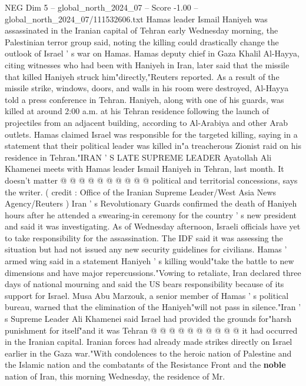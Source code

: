 \begin{textsample}{NEG Dim 5 – global\_north\_2024\_07 – Score -1.00 – global\_north\_2024\_07/111532606.txt}  \label{ex:f5_neg_159}
Hamas leader Ismail Haniyeh was assassinated in the Iranian capital of Tehran early Wednesday morning, the Palestinian terror group said, noting the killing could drastically change the outlook of Israel ' s war on Hamas.
Hamas deputy chief in Gaza Khalil Al-Hayya, citing witnesses who had been with Haniyeh in Iran, later said that the missile that killed Haniyeh struck him"directly,"Reuters reported.
As a result of the missile strike, windows, doors, and walls in his room were destroyed, Al-Hayya told a press conference in Tehran.
Haniyeh, along with one of his guards, was killed at around 2:00 a.m. at his Tehran residence following the launch of projectiles from an adjacent building, according to Al-Arabiya and other Arab outlets.
Hamas claimed Israel was responsible for the targeted killing, saying in a statement that their political leader was killed in"a treacherous Zionist raid on his residence in Tehran."IRAN ' S LATE SUPREME LEADER Ayatollah Ali Khamenei meets with Hamas leader Ismail Haniyeh in Tehran, last month.
It doesn't matter @ @ @ @ @ @ @ @ @ @ political and territorial concessions, says the writer. ( credit : Office of the Iranian Supreme Leader/West Asia News Agency/Reuters ) Iran ' s Revolutionary Guards confirmed the death of Haniyeh hours after he attended a swearing-in ceremony for the country ' s new president and said it was investigating.
As of Wednesday afternoon, Israeli officials have yet to take responsibility for the assassination.
The IDF said it was assessing the situation but had not issued any new security guidelines for civilians.
Hamas ' armed wing said in a statement Haniyeh ' s killing would"take the battle to new dimensions and have major repercussions."Vowing to retaliate, Iran declared three days of national mourning and said the US bears responsibility because of its support for Israel.
Musa Abu Marzouk, a senior member of Hamas ' s political bureau, warned that the elimination of the Haniyeh"will not pass in silence."Iran ' s Supreme Leader Ali Khamenei said Israel had provided the grounds for"harsh punishment for itself"and it was Tehran @ @ @ @ @ @ @ @ @ @ it had occurred in the Iranian capital.
Iranian forces had already made strikes directly on Israel earlier in the Gaza war."With condolences to the heroic nation of Palestine and the Islamic nation and the combatants of the Resistance Front and the \textbf{noble} nation of Iran, this morning Wednesday, the residence of Mr.

\end{textsample}
